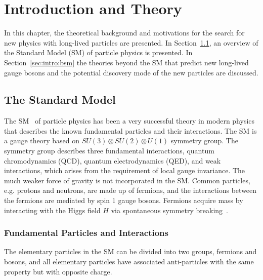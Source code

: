\chapter{Introduction and Theory}
\label{chap:introduction}

In this chapter, the theoretical background and motivations for the search for new physics with long-lived particles are presented. In Section~\ref{sec:intro:standard_model}, an overview of the Standard Model (SM) of particle physics is presented. In Section~\ref{sec:intro:bsm} the theories beyond the SM that predict new long-lived gauge bosons and the potential discovery mode of the new particles are discussed.



\section{The Standard Model}
\label{sec:intro:standard_model}

The SM~\cite{Burgess:1003111} of particle physics has been a very successful theory in modern physics that describes the known fundamental particles and their interactions. The SM is a gauge theory based on $SU(3) \otimes SU(2) \otimes U(1)$ symmetry group. The symmetry group describes three fundamental interactions, quantum chromodynamics (QCD), quantum electrodynamics (QED), and weak interactions, which arises from the requirement of local gauge invariance. The much weaker force of gravity is not incorporated in the SM. Common particles, e.g. protons and neutrons, are made up of fermions, and the interactions between the fermions are mediated by spin 1 gauge bosons. Fermions acquire mass by interacting with the Higgs field $H$ via spontaneous symmetry breaking~\cite{Higgs:429539}.

\subsection{Fundamental Particles and Interactions}
\label{sec:intro:fundamental_particles}
The elementary particles in the SM can be divided into two groups, fermions and bosons, and all elementary particles have associated anti-particles with the same property but with opposite charge.

